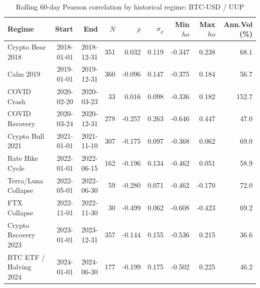 \begin{table}[H]
\centering
\small
\caption{Rolling 60-day Pearson correlation by historical regime: BTC-USD / UUP}
\label{tab:regime_corr_BTCUSDUUP}
\begin{tabular}{lrrrrrrrr}
\toprule
Regime & Start & End & $N$ & $\bar{\rho}$ & $\sigma_\rho$ & Min $
ho$ & Max $
ho$ & Ann.Vol (\%) \\
\midrule
Crypto Bear 2018 & 2018-01-01 & 2018-12-31 & 351 & 0.032 & 0.119 & -0.347 & 0.238 & 68.1 \\
Calm 2019 & 2019-01-01 & 2019-12-31 & 360 & -0.096 & 0.147 & -0.375 & 0.184 & 56.7 \\
COVID Crash & 2020-02-20 & 2020-03-23 & 33 & 0.016 & 0.098 & -0.336 & 0.182 & 152.7 \\
COVID Recovery & 2020-03-24 & 2020-12-31 & 278 & -0.257 & 0.263 & -0.646 & 0.447 & 47.0 \\
Crypto Bull 2021 & 2021-01-01 & 2021-11-10 & 307 & -0.175 & 0.097 & -0.368 & 0.062 & 69.0 \\
Rate Hike Cycle & 2022-01-01 & 2022-06-15 & 162 & -0.196 & 0.134 & -0.462 & 0.051 & 58.9 \\
Terra/Luna Collapse & 2022-05-01 & 2022-06-30 & 59 & -0.280 & 0.071 & -0.462 & -0.170 & 72.0 \\
FTX Collapse & 2022-11-01 & 2022-11-30 & 30 & -0.499 & 0.062 & -0.608 & -0.423 & 69.2 \\
Crypto Recovery 2023 & 2023-01-01 & 2023-12-31 & 357 & -0.144 & 0.155 & -0.536 & 0.215 & 36.6 \\
BTC ETF / Halving 2024 & 2024-01-01 & 2024-06-30 & 177 & -0.199 & 0.175 & -0.502 & 0.225 & 46.2 \\
\bottomrule
\end{tabular}
\end{table}